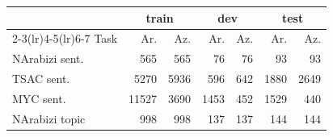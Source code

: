 \begin{tabular}{lrrrrrr}
\toprule
& \multicolumn{2}{c}{train} & \multicolumn{2}{c}{dev} & \multicolumn{2}{c}{test} \\
\cmidrule(lr){2-3}\cmidrule(lr){4-5}\cmidrule(lr){6-7}
Task & Ar. & Az. & Ar. & Az. & Ar. & Az. \\
\midrule
NArabizi sent. & 565 & 565 & 76 & 76 & 93 & 93 \\
TSAC sent. & 5270 & 5936 & 596 & 642 & 1880 & 2649 \\
MYC sent. & 11527 & 3690 & 1453 & 452 & 1529 & 440 \\
NArabizi topic & 998 & 998 & 137 & 137 & 144 & 144 \\
\bottomrule
\end{tabular}
